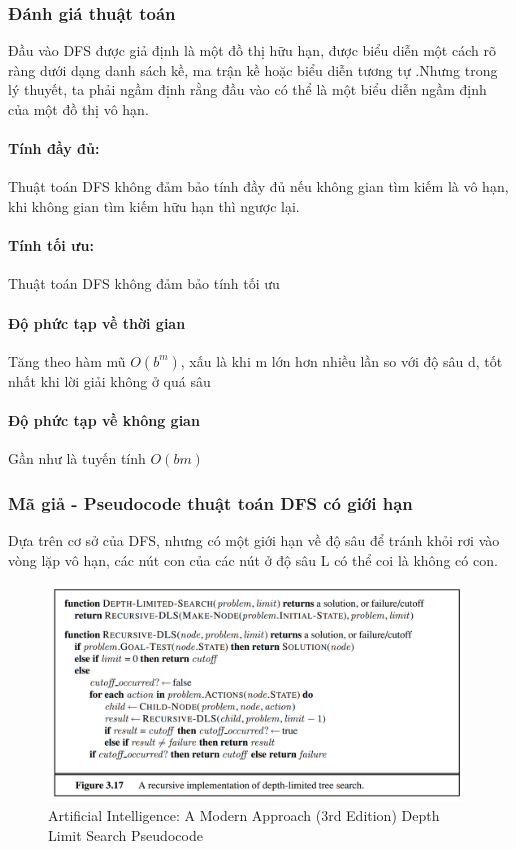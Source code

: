\documentclass{article}
\begin{document}
\subsubsection{Đánh giá thuật toán}
Đầu vào DFS được giả định là một đồ thị hữu hạn, được biểu diễn một cách rõ ràng dưới dạng danh sách kề, ma trận kề hoặc biểu diễn tương tự .Nhưng trong lý thuyết, ta phải ngầm định rằng đầu vào có thể là một biểu diễn ngầm định của một đồ thị vô hạn.

\paragraph{Tính đầy đủ: }
Thuật toán DFS không đảm bảo tính đầy đủ nếu không gian tìm kiếm là vô hạn, khi không gian tìm kiếm hữu hạn thì ngược lại.

\paragraph{Tính tối ưu: }
Thuật toán DFS không đảm bảo tính tối ưu

\paragraph{Độ phức tạp về thời gian}
Tăng theo hàm mũ $O(b^m)$, xấu là khi m lớn hơn nhiều lần so với độ sâu d, tốt nhất khi lời giải không ở quá sâu
\paragraph{Độ phức tạp về không gian}
Gần như là tuyến tính $O(bm)$
\subsubsection{Mã giả - Pseudocode thuật toán DFS có giới hạn}
Dựa trên cơ sở của DFS, nhưng có một giới hạn về độ sâu để tránh khỏi rơi vào vòng lặp vô hạn, các nút con của các nút ở độ sâu L có thể coi là không có con.

\begin{figure}[H]
\centering
\includegraphics[width=0.98\textwidth]{depth-limit-search-figure-3.17.png}
\caption{Artificial Intelligence: A Modern Approach (3rd Edition) Depth Limit Search Pseudocode}
\end{figure}
\end{document}
